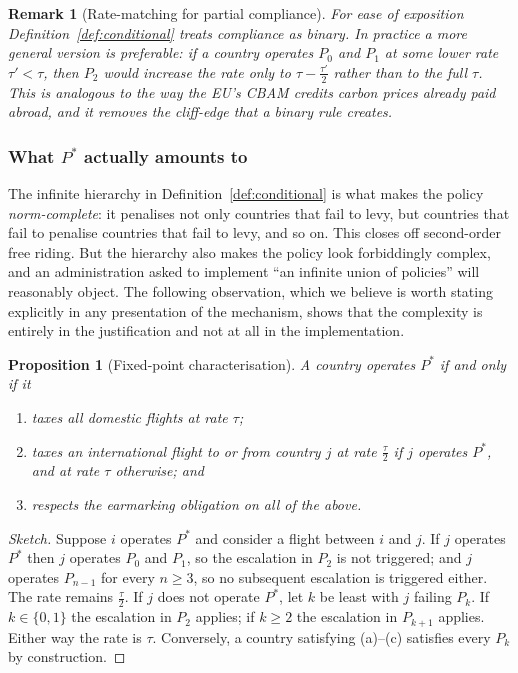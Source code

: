 \documentclass[11pt]{article}
\newtheorem{proposition}{Proposition}
\newtheorem{remark}{Remark}
\begin{document}
\begin{remark}[Rate-matching for partial compliance]
For ease of exposition Definition~\ref{def:conditional} treats compliance as
binary. In practice a more general version is preferable: if a country operates
$P_0$ and $P_1$ at some lower rate $\tau' < \tau$, then $P_2$ would increase the
rate only to $\tau - \tfrac{\tau'}{2}$ rather than to the full $\tau$. This is
analogous to the way the EU's CBAM credits carbon prices already paid abroad, and
it removes the cliff-edge that a binary rule creates.
\end{remark}

\subsubsection{What \texorpdfstring{$P^{*}$}{P*} actually amounts to}

The infinite hierarchy in Definition~\ref{def:conditional} is what makes the
policy \emph{norm-complete}: it penalises not only countries that fail to levy,
but countries that fail to penalise countries that fail to levy, and so on. This
closes off second-order free riding. But the hierarchy also makes the policy look
forbiddingly complex, and an administration asked to implement ``an infinite
union of policies'' will reasonably object. The following observation, which we
believe is worth stating explicitly in any presentation of the mechanism, shows
that the complexity is entirely in the justification and not at all in the
implementation.

\begin{proposition}[Fixed-point characterisation]
\label{prop:fixedpoint}
A country operates $P^{*}$ if and only if it
\begin{enumerate}[label=(\alph*)]
  \item taxes all domestic flights at rate $\tau$;
  \item taxes an international flight to or from country $j$ at rate
  $\tfrac{\tau}{2}$ if $j$ operates $P^{*}$, and at rate $\tau$ otherwise; and
  \item respects the earmarking obligation on all of the above.
\end{enumerate}
\end{proposition}

\begin{proof}[Sketch]
Suppose $i$ operates $P^{*}$ and consider a flight between $i$ and $j$.
If $j$ operates $P^{*}$ then $j$ operates $P_0$ and $P_1$, so the escalation in
$P_2$ is not triggered; and $j$ operates $P_{n-1}$ for every $n \geq 3$, so no
subsequent escalation is triggered either. The rate remains $\tfrac{\tau}{2}$.
If $j$ does not operate $P^{*}$, let $k$ be least with $j$ failing $P_k$. If
$k \in \{0,1\}$ the escalation in $P_2$ applies; if $k \geq 2$ the escalation in
$P_{k+1}$ applies. Either way the rate is $\tau$. Conversely, a country
satisfying (a)--(c) satisfies every $P_k$ by construction.
\end{proof}
\end{document}
